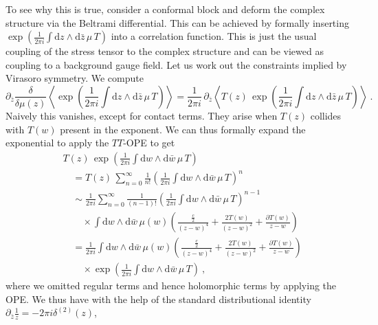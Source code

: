 \documentclass[12pt,a4paper]{article}
\newcommand{\be}{\begin{equation}}
\newcommand{\ee}{\end{equation}}
\renewcommand\d{\text{d}}
\begin{document}
To see why this is true, consider a conformal block and deform the complex structure via the Beltrami differential. This can be achieved by formally inserting $\exp\left(\frac{1}{2\pi i} \int \d z \wedge \d \bar{z} \, \mu \,T\right)$ into a correlation function. This is just the usual coupling of the stress tensor to the complex structure and can be viewed as coupling to a background gauge field. Let us work out the constraints implied by Virasoro symmetry. We compute
\be 
    \partial_{\bar{z}} \frac{\delta}{\delta \mu(z)} \left \langle \exp\left(\frac{1}{2\pi i} \int \d z \wedge \d \bar{z}\, \mu\,T\right) \right \rangle  =\frac{1}{2\pi i} \, \partial_{\bar{z}}\left\langle  T(z)\, \exp\left(\frac{1}{2\pi i} \int \d z \wedge \d \bar{z}\, \mu\, T\right) \right \rangle~.
\ee
Naively this vanishes, except for contact terms. They arise when $T(z)$ collides with $T(w)$ present in the exponent. We can thus formally expand the exponential to apply the $TT$-OPE to get
\begin{align}
    &T(z)\, \exp\left(\frac{1}{2\pi i} \int \d w \wedge \d \bar{w}\, \mu\, T\right)\nonumber\\
    &\quad=T(z)\, \sum_{n=0}^\infty \frac{1}{n!}\left(\frac{1}{2\pi i} \int \d w \wedge \d \bar{w}\, \mu\, T\right)^n \nonumber\\
    &\quad\sim \frac{1}{2\pi i} \sum_{n=0}^\infty \frac{1}{(n-1)!}\left(\frac{1}{2\pi i} \int \d w \wedge \d \bar{w}\, \mu\, T\right)^{n-1}\nonumber\\
    &\qquad\times\int \d w \wedge \d \bar{w}\, \mu(w) \left(\frac{\frac{c}{2}}{(z-w)^4}+\frac{2 T(w)}{(z-w)^2}+\frac{\partial T(w)}{z-w} \right)  \nonumber\\
    &\quad=\frac{1}{2\pi i}\int \d w \wedge \d \bar{w}\, \mu(w) \left(\frac{\frac{c}{2}}{(z-w)^4}+\frac{2 T(w)}{(z-w)^2}+\frac{\partial T(w)}{z-w} \right) \nonumber\\
    &\qquad\times \exp\left(\frac{1}{2\pi i} \int \d w \wedge \d \bar{w}\, \mu\, T\right)~,
\end{align}
where we omitted regular terms and hence holomorphic terms by applying the OPE. We thus have with the help of the standard distributional identity $\partial_{\bar{z}} \frac{1}{z}=-2\pi i \delta^{(2)}(z)$,
\end{document}
